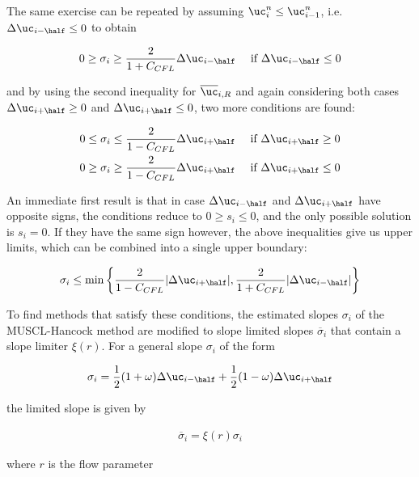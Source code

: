 The same exercise can be repeated by assuming $\uc_i^n \leq \uc_{i-1}^n$, i.e. $\Delta
\uc_{i-\half} \leq 0$ to obtain


\begin{align}
 0 \geq \sigma_i \geq \frac{2}{1 + C_{CFL}} \Delta \uc_{i-\half} &&
 \text{ if } \Delta \uc_{i-\half} \leq 0
\end{align}

and by using the second inequality for $\overline{\uc}_{i,R}$ and again considering both cases
$\Delta \uc_{i+\half} \geq 0$ and $\Delta \uc_{i+\half} \leq 0$, two more conditions are found:


\begin{align}
 0 \leq \sigma_i &\leq \frac{2}{1 - C_{CFL}} \Delta \uc_{i+\half} &&
 \text{ if } \Delta \uc_{i+\half} \geq 0 \\
 0 \geq \sigma_i &\geq \frac{2}{1 - C_{CFL}} \Delta \uc_{i+\half} &&
 \text{ if } \Delta \uc_{i+\half} \leq 0
\end{align}


An immediate first result is that in case $\Delta \uc_{i-\half}$ and $\Delta \uc_{i+\half}$ have
opposite signs, the conditions reduce to $0 \geq s_i \leq 0$, and the only possible solution is
$s_i = 0$. If they have the same sign however, the above inequalities give us upper limits, which
can be combined into a single upper boundary:

\begin{align}
    \sigma_i \leq \min \left\{\frac{2}{1 - C_{CFL}} | \Delta \uc_{i+\half}|, \frac{2}{1 + C_{CFL}}
|\Delta \uc_{i-\half}| \right\}
\end{align}


To find methods that satisfy these conditions, the estimated slopes $\sigma_i$ of the MUSCL-Hancock
method are modified to slope limited slopes $\overline{\sigma}_i$ that contain a slope limiter
$\xi(r)$.
For a general slope $\sigma_i$ of the form

\begin{align}
    \sigma_i =
    \frac{1}{2} (1 + \omega) \Delta \uc_{i-\half} +
    \frac{1}{2} (1 - \omega) \Delta \uc_{i+\half}
\end{align}

the limited slope is given by

\begin{align}
    \overline{\sigma}_i  = \xi(r) \sigma_i
\end{align}

where $r$ is the flow parameter

